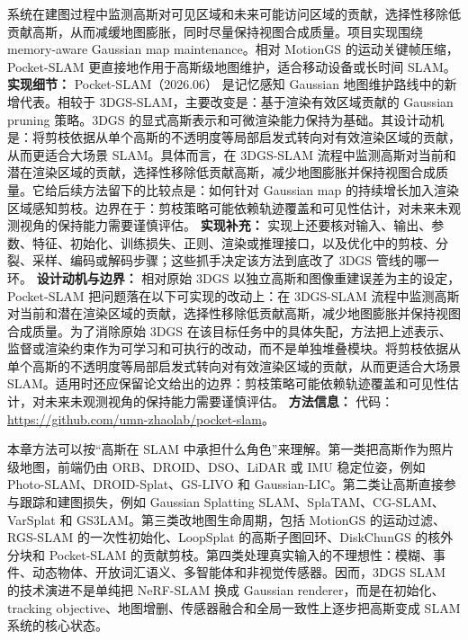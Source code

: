 系统在建图过程中监测高斯对可见区域和未来可能访问区域的贡献，选择性移除低贡献高斯，从而减缓地图膨胀，同时尽量保持视图合成质量。项目实现围绕 memory-aware Gaussian map maintenance。相对 MotionGS 的运动关键帧压缩，Pocket-SLAM 更直接地作用于高斯级地图维护，适合移动设备或长时间 SLAM。
\textbf{实现细节：} Pocket-SLAM（2026.06） 是记忆感知 Gaussian 地图维护路线中的新增代表。相较于 3DGS-SLAM，主要改变是：基于渲染有效区域贡献的 Gaussian pruning 策略。3DGS 的显式高斯表示和可微渲染能力保持为基础。其设计动机是：将剪枝依据从单个高斯的不透明度等局部启发式转向对有效渲染区域的贡献，从而更适合大场景 SLAM。具体而言，在 3DGS-SLAM 流程中监测高斯对当前和潜在渲染区域的贡献，选择性移除低贡献高斯，减少地图膨胀并保持视图合成质量。它给后续方法留下的比较点是：如何针对 Gaussian map 的持续增长加入渲染区域感知剪枝。边界在于：剪枝策略可能依赖轨迹覆盖和可见性估计，对未来未观测视角的保持能力需要谨慎评估。
\textbf{实现补充：} 实现上还要核对输入、输出、参数、特征、初始化、训练损失、正则、渲染或推理接口，以及优化中的剪枝、分裂、采样、编码或解码步骤；这些抓手决定该方法到底改了 3DGS 管线的哪一环。
\textbf{设计动机与边界：} 相对原始 3DGS 以独立高斯和图像重建误差为主的设定，Pocket-SLAM 把问题落在以下可实现的改动上：在 3DGS-SLAM 流程中监测高斯对当前和潜在渲染区域的贡献，选择性移除低贡献高斯，减少地图膨胀并保持视图合成质量。为了消除原始 3DGS 在该目标任务中的具体失配，方法把上述表示、监督或渲染约束作为可学习和可执行的改动，而不是单独堆叠模块。将剪枝依据从单个高斯的不透明度等局部启发式转向对有效渲染区域的贡献，从而更适合大场景 SLAM。适用时还应保留论文给出的边界：剪枝策略可能依赖轨迹覆盖和可见性估计，对未来未观测视角的保持能力需要谨慎评估。
\textbf{方法信息：} 代码：\url{https://github.com/umn-zhaolab/pocket-slam}。

\begin{takeaway}
本章方法可以按“高斯在 SLAM 中承担什么角色”来理解。第一类把高斯作为照片级地图，前端仍由 ORB、DROID、DSO、LiDAR 或 IMU 稳定位姿，例如 Photo-SLAM、DROID-Splat、GS-LIVO 和 Gaussian-LIC。第二类让高斯直接参与跟踪和建图损失，例如 Gaussian Splatting SLAM、SplaTAM、CG-SLAM、VarSplat 和 GS3LAM。第三类改地图生命周期，包括 MotionGS 的运动过滤、RGS-SLAM 的一次性初始化、LoopSplat 的高斯子图回环、DiskChunGS 的核外分块和 Pocket-SLAM 的贡献剪枝。第四类处理真实输入的不理想性：模糊、事件、动态物体、开放词汇语义、多智能体和非视觉传感器。因而，3DGS SLAM 的技术演进不是单纯把 NeRF-SLAM 换成 Gaussian renderer，而是在初始化、tracking objective、地图增删、传感器融合和全局一致性上逐步把高斯变成 SLAM 系统的核心状态。
\end{takeaway}
